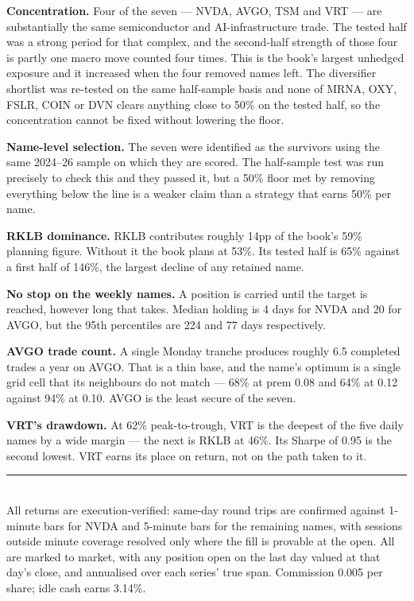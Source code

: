 \documentclass[11pt]{article}
\begin{document}
\textbf{Concentration.} Four of the seven --- NVDA, AVGO, TSM and VRT --- are substantially the
same semiconductor and AI-infrastructure trade. The tested half was a strong period for that
complex, and the second-half strength of those four is partly one macro move counted four times.
This is the book's largest unhedged exposure and it increased when the four removed names left.
The diversifier shortlist was re-tested on the same half-sample basis and none of MRNA, OXY, FSLR,
COIN or DVN clears anything close to 50\% on the tested half, so the concentration cannot be fixed
without lowering the floor.

\textbf{Name-level selection.} The seven were identified as the survivors using the same 2024--26
sample on which they are scored. The half-sample test was run precisely to check this and they
passed it, but a 50\% floor met by removing everything below the line is a weaker claim than a
strategy that earns 50\% per name.

\textbf{RKLB dominance.} RKLB contributes roughly 14pp of the book's 59\% planning figure. Without
it the book plans at 53\%. Its tested half is 65\% against a first half of 146\%, the largest
decline of any retained name.

\textbf{No stop on the weekly names.} A position is carried until the target is reached, however
long that takes. Median holding is 4 days for NVDA and 20 for AVGO, but the 95th percentiles are
224 and 77 days respectively.

\textbf{AVGO trade count.} A single Monday tranche produces roughly 6.5 completed trades a year on
AVGO. That is a thin base, and the name's optimum is a single grid cell that its neighbours do not
match --- 68\% at prem 0.08 and 64\% at 0.12 against 94\% at 0.10. AVGO is the least secure of the
seven.

\textbf{VRT's drawdown.} At 62\% peak-to-trough, VRT is the deepest of the five daily names by a
wide margin --- the next is RKLB at 46\%. Its Sharpe of 0.95 is the second lowest. VRT earns its
place on return, not on the path taken to it.

\vfill
{\color{bcrule}\rule{\textwidth}{0.6pt}}\\[0.2em]
{\footnotesize\color{bcgrey} All returns are execution-verified: same-day round trips are
confirmed against 1-minute bars for NVDA and 5-minute bars for the remaining names, with sessions
outside minute coverage resolved only where the fill is provable at the open. All are marked to
market, with any position open on the last day valued at that day's close, and annualised over
each series' true span. Commission 0.005 per share; idle cash earns 3.14\%.}
\end{document}
